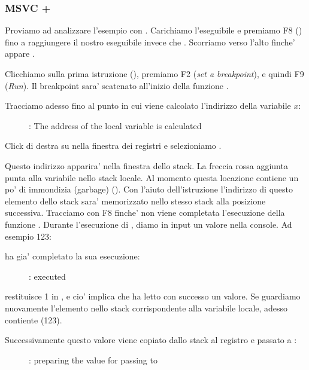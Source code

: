 \clearpage
\subsubsection{MSVC + \olly}
\myindex{\olly}

Proviamo ad analizzare l'esempio con \olly.
Carichiamo l'eseguibile e premiamo F8 (\stepover) fino a raggiungere il nostro eseguibile invece che .
Scorriamo verso l'alto finche' appare \main .

Clicchiamo sulla prima istruzione (), premiamo F2 (\emph{set a breakpoint}), e quindi F9 (\emph{Run}).
Il breakpoint sara' scatenato all'inizio della funzione \main .

Tracciamo adesso fino al punto in cui viene calcolato l'indirizzo della variabile $x$:

\begin{figure}[H]
\centering
{}
\caption{\olly: The address of the local variable is calculated}
\label{fig:scanf_ex1_olly_1}
\end{figure}


Click di destra su \EAX nella finestra dei registri e selezioniamo .

Questo indirizzo apparira' nella finestra dello stack.
La freccia rossa aggiunta punta alla variabile nello stack locale.
Al momento questa locazione contiene un po' di immondizia (garbage) ().
Con l'aiuto dell'istruzione \PUSH l'indirizzo di questo elemento dello stack sara' memorizzato nello stesso stack alla posizione successiva.
Tracciamo con F8 finche' non viene completata l'esecuzione della funzione \scanf.
Durante l'esecuzione di \scanf, diamo in input un valore nella console. Ad esempio 123:



\clearpage
\scanf ha gia' completato la sua esecuzione:

\begin{figure}[H]
\centering
{}
\caption{\olly: \scanf executed}
\label{fig:scanf_ex1_olly_3}
\end{figure}

\scanf restituisce 1 in \EAX, e cio' implica che ha letto con successo un valore.
Se guardiamo nuovamente l'elemento nello stack corrispondente alla variabile locale, adesso contiente  (123).

\clearpage

Successivamente questo valore viene copiato dallo stack al registro \ECX e passato a \printf:

\begin{figure}[H]
\centering
{}
\caption{\olly: preparing the value for passing to \printf}
\label{fig:scanf_ex1_olly_4}
\end{figure}

